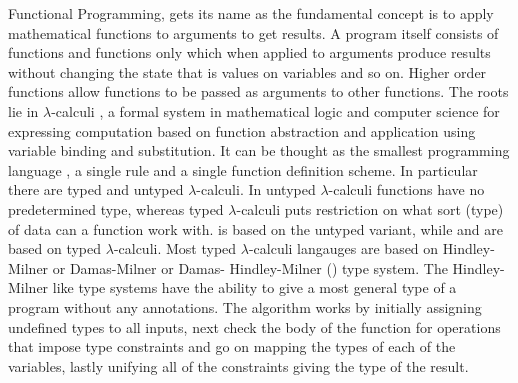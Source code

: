 \documentclass[thesis-solanki.tex]{subfiles}
\begin{document}
Functional Programming, \cite{hughes1989functional} gets its name as the fundamental concept is to apply
mathematical functions to arguments to get results.
A program itself consists of functions and functions only which when applied to arguments produce results without
changing the state that is values on variables and so on.
Higher order functions allow functions to be passed as arguments to other functions.
The roots lie in $\lambda$-calculi \cite{website:lambdacalculuswiki}, a formal system in mathematical logic and
computer science for expressing computation based on function abstraction and application using variable binding
and substitution.
It can be thought as the smallest programming language \cite{rojas2004tutorial}, a single rule and a single
function definition scheme.
In particular there are typed and untyped $\lambda$-calculi.
In untyped $\lambda$-calculi functions have no predetermined type, whereas typed $\lambda$-calculi puts
restriction on what sort (type) of data can a function work with.
 is based on the untyped variant, while  and  are based on typed
$\lambda$-calculi.
Most typed $\lambda$-calculi langauges are based on Hindley-Milner or Damas-Milner or Damas- Hindley-Milner
(\cite{hindley1969principal,milner1978theory,website:hdmtypesystemwiki}) type system.
The Hindley-Milner like type systems have the ability to give a most general type of a program without any
annotations. 
The algorithm \cite{website:hdmtypesystem} works by initially assigning undefined types to all inputs, next check
the body of the function for operations that impose type constraints and go on mapping the types of each of the
variables, lastly unifying all of the constraints giving the type of the result.
\end{document}
